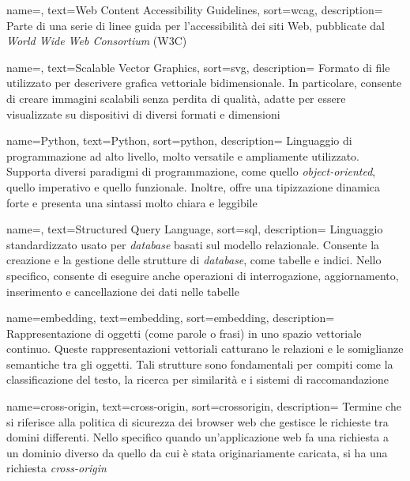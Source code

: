  {
    name=,
    text=Web Content Accessibility Guidelines,
    sort=wcag,
    description=
    {Parte di una serie di linee guida per l'accessibilità dei siti Web, pubblicate dal \emph{World Wide Web Consortium} (W3C)}
}

 {
    name=,
    text=Scalable Vector Graphics,
    sort=svg,
    description=
        {Formato di file utilizzato per descrivere grafica vettoriale bidimensionale. 
        In particolare, consente di creare immagini scalabili senza perdita di qualità, adatte per essere visualizzate su 
        dispositivi di diversi formati e dimensioni}
}

 {
    name=Python,
    text=Python,
    sort=python,
    description=
    {Linguaggio di programmazione ad alto livello, molto versatile e ampliamente utilizzato.
    Supporta diversi paradigmi di programmazione, come quello \emph{object-oriented}, quello imperativo e quello funzionale.
    Inoltre, offre una tipizzazione dinamica forte e presenta una sintassi molto chiara e leggibile}
}

 {
    name=,
    text=Structured Query Language,
    sort=sql,
    description=
    {Linguaggio standardizzato usato per \emph{database} basati sul modello relazionale.
    Consente la creazione e la gestione delle strutture di \emph{database}, come tabelle e indici. Nello specifico, consente di eseguire anche operazioni di 
    interrogazione, aggiornamento, inserimento e cancellazione dei dati nelle tabelle}
}

 {
    name=embedding,
    text=embedding,
    sort=embedding,
    description=
    {Rappresentazione di oggetti (come parole o frasi) in uno spazio vettoriale continuo. Queste rappresentazioni vettoriali catturano le relazioni e le somiglianze semantiche tra gli oggetti.
    Tali strutture sono fondamentali per compiti come la classificazione del testo, la ricerca per similarità e i sistemi di raccomandazione}
}

 {
    name=cross-origin,
    text=cross-origin,
    sort=crossorigin,
    description=
    {Termine che si riferisce alla politica di sicurezza dei browser web che gestisce le richieste tra domini differenti. 
    Nello specifico quando un'applicazione web fa una richiesta a un dominio diverso da quello da cui è stata originariamente caricata, si ha una richiesta \emph{cross-origin}}
}

